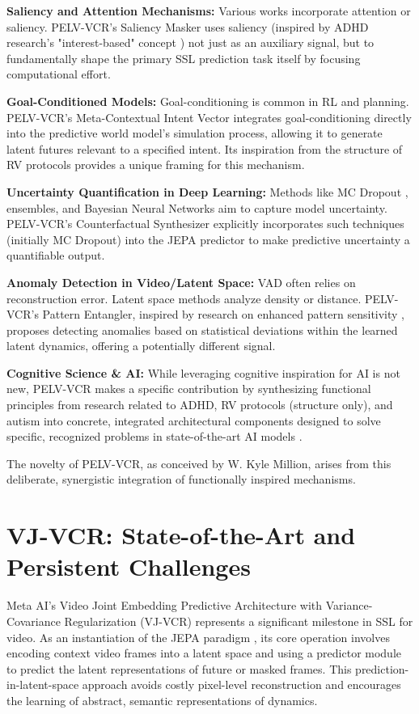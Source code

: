\documentclass[11pt]{article}
\begin{document}
\textbf{Saliency and Attention Mechanisms:} Various works incorporate attention or saliency. PELV-VCR's Saliency Masker uses saliency (inspired by ADHD research's "interest-based" concept \cite{DodsonVarious}) not just as an auxiliary signal, but to fundamentally shape the primary SSL prediction task itself by focusing computational effort.

\textbf{Goal-Conditioned Models:} Goal-conditioning is common in RL and planning. PELV-VCR's Meta-Contextual Intent Vector integrates goal-conditioning directly into the predictive world model's simulation process, allowing it to generate latent futures relevant to a specified intent. Its inspiration from the structure of RV protocols \cite{Puthoff1996} provides a unique framing for this mechanism.

\textbf{Uncertainty Quantification in Deep Learning:} Methods like MC Dropout \cite{Gal2016}, ensembles, and Bayesian Neural Networks aim to capture model uncertainty. PELV-VCR's Counterfactual Synthesizer explicitly incorporates such techniques (initially MC Dropout) into the JEPA predictor to make predictive uncertainty a quantifiable output.

\textbf{Anomaly Detection in Video/Latent Space:} VAD often relies on reconstruction error. Latent space methods analyze density or distance. PELV-VCR's Pattern Entangler, inspired by research on enhanced pattern sensitivity \cite{Mottron2006, BaronCohen2009}, proposes detecting anomalies based on statistical deviations within the learned latent dynamics, offering a potentially different signal.

\textbf{Cognitive Science \& AI:} While leveraging cognitive inspiration for AI is not new, PELV-VCR makes a specific contribution by synthesizing functional principles from research related to ADHD, RV protocols (structure only), and autism into concrete, integrated architectural components designed to solve specific, recognized problems in state-of-the-art AI models \cite{NRC1995, Samson2011, Zhu2023, Bardes2022}.

The novelty of PELV-VCR, as conceived by W. Kyle Million, arises from this deliberate, synergistic integration of functionally inspired mechanisms.

\section{VJ-VCR: State-of-the-Art and Persistent Challenges}
\label{sec:challenges}
Meta AI's Video Joint Embedding Predictive Architecture with Variance-Covariance Regularization (VJ-VCR) \cite{Bardes2024} represents a significant milestone in SSL for video. As an instantiation of the JEPA paradigm \cite{LeCun2022}, its core operation involves encoding context video frames into a latent space and using a predictor module to predict the latent representations of future or masked frames. This prediction-in-latent-space approach avoids costly pixel-level reconstruction and encourages the learning of abstract, semantic representations of dynamics.
\end{document}
